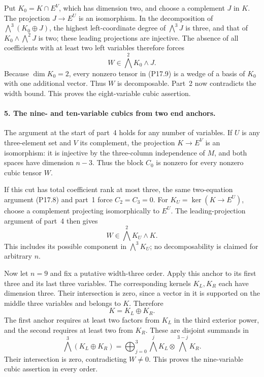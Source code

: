 Put $K_0=K\cap E^V$, which has dimension two, and choose a
complement $J$ in $K$. The projection $J\to E^U$ is an
isomorphism. In the decomposition of $\bigwedge^3(K_0\oplus J)$,
the highest left-coordinate degree of $\bigwedge^3J$ is three,
and that of $K_0\wedge\bigwedge^2J$ is two; these leading
projections are injective. The absence of all coefficients
with at least two left variables therefore forces
\[
 W\in\bigwedge^2K_0\wedge J.
 \tag{P17.9}
\]
Because $\dim K_0=2$, every nonzero tensor in (P17.9) is a
wedge of a basis of $K_0$ with one additional vector. Thus
$W$ is decomposable. Part~2 now contradicts the width bound.
This proves the eight-variable cubic assertion.

\paragraph{5. The nine- and ten-variable cubics from two end anchors.}
The argument at the start of part~4 holds for any number of
variables. If $U$ is any three-element set and $V$ its complement,
the projection $K\to E^V$ is an isomorphism: it is injective by
the three-column independence of $M$, and both spaces have
dimension $n-3$. Thus the block $C_0$ is nonzero for every
nonzero cubic tensor $W$.

If this cut has total coefficient rank at most three, the same
two-equation argument (P17.8) and part~1 force $C_2=C_3=0$.
For $K_U=\ker(K\to E^U)$, choose a complement projecting
isomorphically to $E^U$. The leading-projection argument of
part~4 then gives
\[
 W\in\bigwedge^2K_U\wedge K.
 \tag{P17.12}
\]
This includes its possible component in $\bigwedge^3K_U$;
no decomposability is claimed for arbitrary $n$.

Now let $n=9$ and fix a putative width-three order. Apply this
anchor to its first three and its last three variables. The
corresponding kernels $K_L,K_R$ each have dimension three.
Their intersection is zero, since a vector in it is supported
on the middle three variables and belongs to $K$. Therefore
\[
 K=K_L\oplus K_R.
\]
The first anchor requires at least two factors from $K_L$ in
the third exterior power, and the second requires at least
two from $K_R$. These are disjoint summands in
\[
 \bigwedge^3(K_L\oplus K_R)
 =\bigoplus_{j=0}^3
      \bigwedge^jK_L\otimes\bigwedge^{3-j}K_R.
\]
Their intersection is zero, contradicting $W\ne0$.
This proves the nine-variable cubic assertion in every order.

